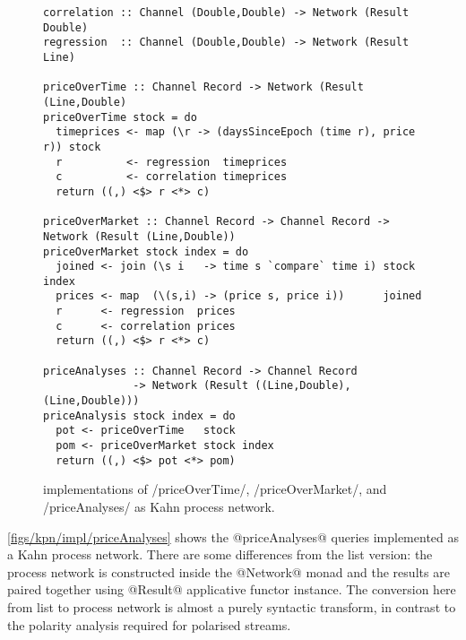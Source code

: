 \begin{figure}
\begin{lstlisting}
correlation :: Channel (Double,Double) -> Network (Result Double)
regression  :: Channel (Double,Double) -> Network (Result Line)

priceOverTime :: Channel Record -> Network (Result (Line,Double)
priceOverTime stock = do
  timeprices <- map (\r -> (daysSinceEpoch (time r), price r)) stock
  r          <- regression  timeprices
  c          <- correlation timeprices
  return ((,) <$> r <*> c)

priceOverMarket :: Channel Record -> Channel Record -> Network (Result (Line,Double))
priceOverMarket stock index = do
  joined <- join (\s i   -> time s `compare` time i) stock index
  prices <- map  (\(s,i) -> (price s, price i))      joined
  r      <- regression  prices
  c      <- correlation prices
  return ((,) <$> r <*> c)

priceAnalyses :: Channel Record -> Channel Record
              -> Network (Result ((Line,Double),(Line,Double)))
priceAnalysis stock index = do
  pot <- priceOverTime   stock
  pom <- priceOverMarket stock index
  return ((,) <$> pot <*> pom)
\end{lstlisting}
\caption{implementations of \Hs/priceOverTime/, \Hs/priceOverMarket/, and \Hs/priceAnalyses/ as Kahn process network.} 
\label{figs/kpn/impl/priceAnalyses}
\end{figure}

\autoref{figs/kpn/impl/priceAnalyses} shows the @priceAnalyses@ queries implemented as a Kahn process network.
There are some differences from the list version: the process network is constructed inside the @Network@ monad and the results are paired together using @Result@ applicative functor instance.
The conversion here from list to process network is almost a purely syntactic transform, in contrast to the polarity analysis required for polarised streams.

